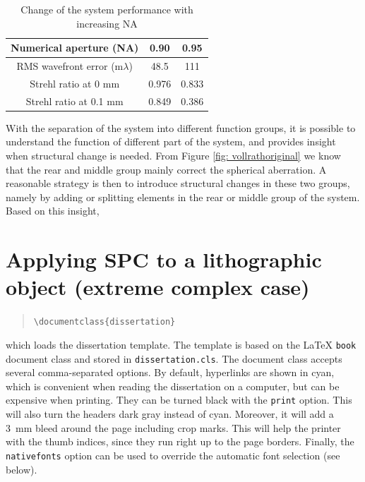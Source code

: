 \setlength{\arrayrulewidth}{.5mm}
\setlength{\tabcolsep}{18pt}
\renewcommand{\arraystretch}{1.2}
\begin{table}[h!]
    \centering
    \captionsetup{justification=centering}
    \caption{Change of the system performance with increasing NA}
    \label{table: NAchange}
    \vspace{-1em}
    \begin{tabular}{ c c c }
    \hline 
     Numerical aperture (NA) & 0.90 & 0.95\\ 
     \midrule
    RMS wavefront error (m$\lambda$) & 48.5 & 111  \\ 
    Strehl ratio at 0 mm & 0.976 & 0.833\\
    Strehl ratio at 0.1 mm & 0.849 & 0.386\\
    \hline
    \end{tabular}
\end{table}

With the separation of the system into different function groups, it is possible to understand the function of different part of the system, and provides insight when structural change is needed. From Figure \ref{fig: vollrathoriginal} we know that the rear and middle group mainly correct the spherical aberration. A reasonable strategy is then to introduce structural changes in these two groups, namely by adding or splitting elements in the rear or middle group of the system. Based on this insight,   



\section{Applying SPC to a lithographic object (extreme complex case)}


\begin{quote}
\texttt{\textbackslash documentclass\{dissertation\}}
\end{quote}
which loads the dissertation template. The template is based on the \LaTeX{} \texttt{book} document class and stored in \texttt{dissertation.cls}. The document class accepts several comma-separated options. By default, hyperlinks are shown in cyan, which is convenient when reading the dissertation on a computer, but can be expensive when printing. They can be turned black with the \texttt{print} option. This will also turn the headers dark gray instead of cyan. Moreover, it will add a 3~mm bleed around the page including crop marks. This will help the printer with the thumb indices, since they run right up to the page borders. Finally, the \texttt{nativefonts} option can be used to override the automatic font selection (see below).

